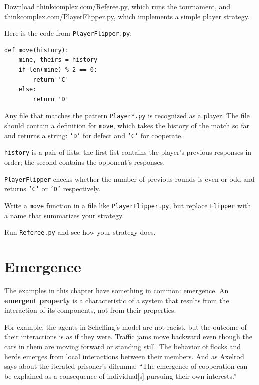 \documentclass[10pt]{book}
\begin{document}
\begin{ex}

Download \url{thinkcomplex.com/Referee.py}, which runs the tournament,
and \url{thinkcomplex.com/PlayerFlipper.py}, which implements a simple
player strategy.

Here is the code from {\tt PlayerFlipper.py}:

\begin{verbatim}
def move(history):
    mine, theirs = history
    if len(mine) % 2 == 0:
        return 'C'
    else:
        return 'D'
\end{verbatim}

Any file that matches the pattern {\tt Player*.py} is recognized
as a player.  The file should contain a definition for {\tt move},
which takes the history of the match so far and returns a string:
{\tt 'D'} for defect and {\tt 'C'} for cooperate.

{\tt history} is a pair of lists: the first list contains the
player's previous responses in order; the second contains the
opponent's responses.

{\tt PlayerFlipper} checks whether the number of previous rounds
is even or odd and returns {\tt 'C'} or {\tt 'D'} respectively.

Write a {\tt move} function in a file like {\tt PlayerFlipper.py}, but
replace {\tt Flipper} with a name that summarizes your strategy.

Run {\tt Referee.py} and see how your strategy does.

\end{ex}


\section{Emergence}

The examples in this chapter have something in common: emergence.  An
{\bf emergent property} is a characteristic of a system that results
from the interaction of its components, not from their properties.

For example, the agents in Schelling's model are not racist, but the
outcome of their interactions is as if they were.  Traffic jams move
backward even though the cars in them are moving forward or standing
still.  The behavior of flocks and herds emerges from local
interactions between their members.  And as Axelrod says about the
iterated prisoner's dilemma: ``The emergence of cooperation can be
explained as a consequence of individual[s] pursuing their own
interests.''
\end{document}
